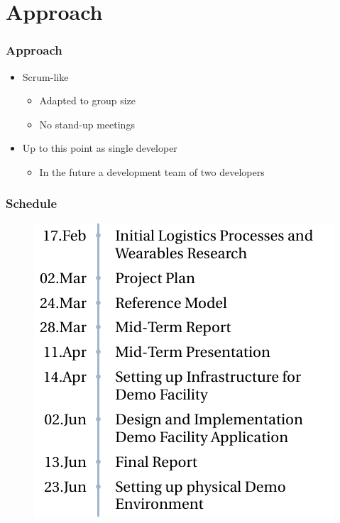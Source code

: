 \section{Approach}
\begin{frame}\frametitle{Approach}
	\begin{itemize}
		\item Scrum-like
		\begin{itemize}
			\item Adapted to group size
			\item No stand-up meetings
		\end{itemize}
		\item Up to this point as single developer
		\begin{itemize}
			\item In the future a development team of two developers
		\end{itemize}
	\end{itemize}
\end{frame}
\begin{frame}\frametitle{Schedule}
\begin{figure}
	\includegraphics[scale=0.9]{images/TimeLine}
\end{figure}
\end{frame}